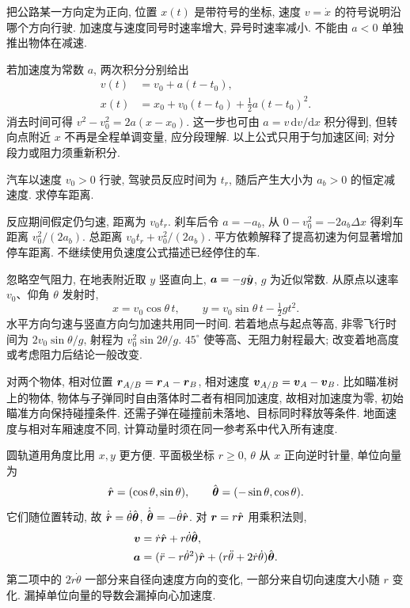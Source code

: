 \label{ch:kin}
把公路某一方向定为正向, 位置 $x(t)$ 是带符号的坐标, 速度 $v=\dot x$ 的符号说明沿哪个方向行驶. 加速度与速度同号时速率增大, 异号时速率减小. 不能由 $a<0$ 单独推出物体在减速.

若加速度为常数 $a$, 两次积分分别给出
\begin{align}
v(t)&=v_0+a(t-t_0),\\
x(t)&=x_0+v_0(t-t_0)+\tfrac12a(t-t_0)^2.
\end{align}
消去时间可得 $v^2-v_0^2=2a(x-x_0)$. 这一步也可由 $a=v\,\mathrm dv/\mathrm dx$ 积分得到, 但转向点附近 $x$ 不再是全程单调变量, 应分段理解. 以上公式只用于匀加速区间; 对分段力或阻力须重新积分.

\begin{example}
汽车以速度 $v_0>0$ 行驶, 驾驶员反应时间为 $t_r$, 随后产生大小为 $a_b>0$ 的恒定减速度. 求停车距离.
\end{example}
\begin{solution}
反应期间假定仍匀速, 距离为 $v_0t_r$. 刹车后令 $a=-a_b$, 从 $0-v_0^2=-2a_b\Delta x$ 得刹车距离 $v_0^2/(2a_b)$. 总距离 $v_0t_r+v_0^2/(2a_b)$. 平方依赖解释了提高初速为何显著增加停车距离. 不继续使用负速度公式描述已经停住的车.
\end{solution}

忽略空气阻力, 在地表附近取 $y$ 竖直向上, $\boldsymbol{a}=-g\hat{\boldsymbol{y}}$, $g$ 为近似常数. 从原点以速率 $v_0$、仰角 $\theta$ 发射时,
\begin{equation}
x=v_0\cos\theta\,t,\qquad y=v_0\sin\theta\,t-\tfrac12gt^2.
\end{equation}
水平方向匀速与竖直方向匀加速共用同一时间. 若着地点与起点等高, 非零飞行时间为 $2v_0\sin\theta/g$, 射程为 $v_0^2\sin2\theta/g$. $45^\circ$ 使等高、无阻力射程最大; 改变着地高度或考虑阻力后结论一般改变.

对两个物体, 相对位置 $\boldsymbol{r}_{A/B}=\boldsymbol{r}_A-\boldsymbol{r}_B$, 相对速度 $\boldsymbol{v}_{A/B}=\boldsymbol{v}_A-\boldsymbol{v}_B$. 比如瞄准树上的物体, 物体与子弹同时自由落体时二者有相同加速度, 故相对加速度为零, 初始瞄准方向保持碰撞条件. 还需子弹在碰撞前未落地、目标同时释放等条件. 地面速度与相对车厢速度不同, 计算动量时须在同一参考系中代入所有速度.

圆轨道用角度比用 $x,y$ 更方便. 平面极坐标 $r\ge0$, $\theta$ 从 $x$ 正向逆时针量, 单位向量为
\begin{equation}
\hat{\boldsymbol{r}}=(\cos\theta,\sin\theta),\qquad
\hat{\boldsymbol{\theta}}=(-\sin\theta,\cos\theta).
\end{equation}
它们随位置转动, 故 $\dot{\hat{\boldsymbol{r}}}=\dot\theta\hat{\boldsymbol{\theta}}$, $\dot{\hat{\boldsymbol{\theta}}}=-\dot\theta\hat{\boldsymbol{r}}$. 对 $\boldsymbol{r}=r\hat{\boldsymbol{r}}$ 用乘积法则,
\begin{align}
\boldsymbol{v}&=\dot r\hat{\boldsymbol{r}}+r\dot\theta\hat{\boldsymbol{\theta}},\\
\boldsymbol{a}&=(\ddot r-r\dot\theta^2)\hat{\boldsymbol{r}}+(r\ddot\theta+2\dot r\dot\theta)\hat{\boldsymbol{\theta}}.\label{eq:polar}
\end{align}
第二项中的 $2\dot r\dot\theta$ 一部分来自径向速度方向的变化, 一部分来自切向速度大小随 $r$ 变化. 漏掉单位向量的导数会漏掉向心加速度.

